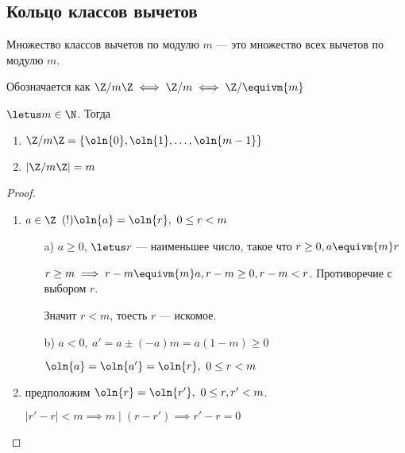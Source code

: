 \subsection{Кольцо классов вычетов}

\begin{defn}
    Множество классов вычетов по модулю $m$ --- это множество всех вычетов по модулю $m$.

    Обозначается как $\Z/m\Z \iff \Z/m \iff \Z/\equivm{m}$
\end{defn}

\begin{theorem}

    $\letus m \in \N$. Тогда 
    
    \begin{enumerate}
        \item $\Z/m\Z = \{\oln{0}, \oln{1}, \ldots, \oln{m-1}\}$
        \item $|\Z/m\Z| = m$ 
    \end{enumerate}
\end{theorem}

\begin{proof}~

    \begin{enumerate}
        \item $a \in \Z$ $(!) \oln{a} = \oln{r},~0 \leq r < m$
        \begin{enumerate}
            \item[a)] $a \geq 0$, $\letus r$ --- наименьшее число, такое что $r \geq 0, a \equivm{m} r$
            
            $r \geq m \implies r - m \equivm{m} a, r - m \geq 0, r - m < r$. Противоречие с выбором $r$.
            
            Значит $r < m$, тоесть $r$ --- искомое.
            
            \item[b)] $a < 0,~a' = a \pm (-a)m = a(1-m) \geq 0$
            
            $\oln{a} = \oln{a'} = \oln{r},~0 \leq r < m$
        \end{enumerate}
        
        \item предположим $\oln{r} = \oln{r'},~0 \leq r, r' < m$.
        
        $|r' - r| < m \implies m \mid (r - r') \implies r' - r = 0$
    \end{enumerate}
\end{proof}

